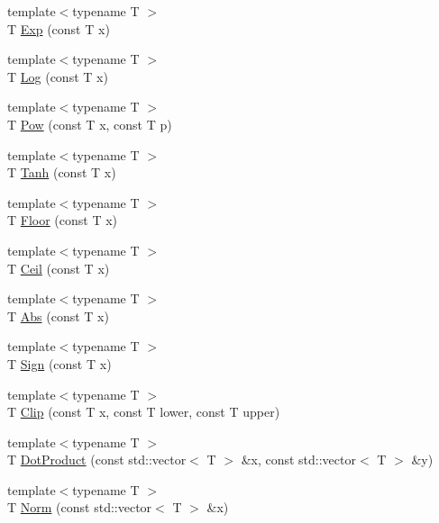 \begin{DoxyCompactItemize}
{\footnotesize template$<$typename T $>$ }\\T \hyperlink{namespace_c_o_n_t_r_a_l_i_g_n_a5ca67d3de567a8e208454433fc9b3985}{Exp} (const T x)
\item 
{\footnotesize template$<$typename T $>$ }\\T \hyperlink{namespace_c_o_n_t_r_a_l_i_g_n_a4bfa0bc3748b3484f0a9e0d9bb5a62fa}{Log} (const T x)
\item 
{\footnotesize template$<$typename T $>$ }\\T \hyperlink{namespace_c_o_n_t_r_a_l_i_g_n_a2c8a2f8551093619bdb7afa60d34db78}{Pow} (const T x, const T p)
\item 
{\footnotesize template$<$typename T $>$ }\\T \hyperlink{namespace_c_o_n_t_r_a_l_i_g_n_a054e3c2a248dca86c547d357c0063808}{Tanh} (const T x)
\item 
{\footnotesize template$<$typename T $>$ }\\T \hyperlink{namespace_c_o_n_t_r_a_l_i_g_n_a8eab454f786925da404894d345c55572}{Floor} (const T x)
\item 
{\footnotesize template$<$typename T $>$ }\\T \hyperlink{namespace_c_o_n_t_r_a_l_i_g_n_a71287d09e3234f79f410137964df4d2f}{Ceil} (const T x)
\item 
{\footnotesize template$<$typename T $>$ }\\T \hyperlink{namespace_c_o_n_t_r_a_l_i_g_n_ac6566074a120c798141a91753c50290f}{Abs} (const T x)
\item 
{\footnotesize template$<$typename T $>$ }\\T \hyperlink{namespace_c_o_n_t_r_a_l_i_g_n_aa4f87aa569c6cb44a0e15a73cc475c13}{Sign} (const T x)
\item 
{\footnotesize template$<$typename T $>$ }\\T \hyperlink{namespace_c_o_n_t_r_a_l_i_g_n_a469955594da581dc70e2bafc9f235680}{Clip} (const T x, const T lower, const T upper)
\item 
{\footnotesize template$<$typename T $>$ }\\T \hyperlink{namespace_c_o_n_t_r_a_l_i_g_n_a060f37f304d3b409ad044d105b37c4af}{Dot\+Product} (const std\+::vector$<$ T $>$ \&x, const std\+::vector$<$ T $>$ \&y)
\item 
{\footnotesize template$<$typename T $>$ }\\T \hyperlink{namespace_c_o_n_t_r_a_l_i_g_n_aea939de28045df5b9199ff4bf6a93b49}{Norm} (const std\+::vector$<$ T $>$ \&x)
\item 

\end{DoxyCompactItemize}
